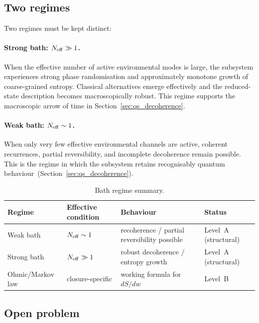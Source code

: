 \documentclass[11pt,a4paper]{article}
\numberwithin{equation}{section}
\begin{document}
\subsection*{Two regimes}

Two regimes must be kept distinct:

\paragraph{Strong bath: $N_{\rm eff}\gg 1$.}
When the effective number of active environmental modes is large, the
subsystem experiences strong phase randomisation and approximately
monotone growth of coarse-grained entropy.
Classical alternatives emerge effectively and the reduced-state
description becomes macroscopically robust.
This regime supports the macroscopic arrow of time in
Section~\ref{sec:qs_decoherence}.

\paragraph{Weak bath: $N_{\rm eff}\sim 1$.}
When only very few effective environmental channels are active, coherent
recurrences, partial reversibility, and incomplete decoherence remain
possible.
This is the regime in which the subsystem retains recognisably quantum
behaviour~(Section~\ref{sec:qs_decoherence}).

\begin{table}[h]
\centering\small
\renewcommand{\arraystretch}{1.3}
\caption{Bath regime summary.}
\label{tab:bath_regimes}
\begin{tabular}{p{2.8cm}p{4.0cm}p{3.5cm}p{2.5cm}}
\hline\hline
Regime & Effective condition & Behaviour & Status \\
\hline
Weak bath & $N_{\rm eff}\sim 1$ & recoherence / partial reversibility possible
  & Level~A (structural) \\
Strong bath & $N_{\rm eff}\gg 1$ & robust decoherence / entropy growth
  & Level~A (structural) \\
Ohmic/Markov law & closure-specific & working formula for $dS/dw$
  & Level~B \\
\hline\hline
\end{tabular}
\end{table}

\subsection*{Open problem}
\end{document}
